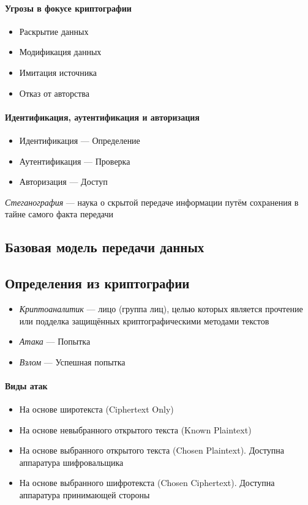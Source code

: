 \documentclass[a4paper, 14pt]{extarticle}
\begin{document}
\paragraph{Угрозы в фокусе криптографии}
\begin{itemize}
    \item Раскрытие данных
    \item Модификация данных
    \item Имитация источника
    \item Отказ от авторства
\end{itemize}

\paragraph{Идентификация, аутентификация и авторизация}
\begin{itemize}
    \item Идентификация --- Определение
    \item Аутентификация --- Проверка
    \item Авторизация --- Доступ
\end{itemize}

\textit{Стеганография} --- наука о скрытой передаче информации путём сохранения в тайне самого факта передачи 

\subsection{Базовая модель передачи данных}

\FloatBarrier{} %
\subsection{Определения из криптографии}

\begin{itemize}
    \item \textit{Криптоаналитик} --- лицо (группа лиц), целью которых является прочтение или подделка защищённых криптографическими методами текстов
    \item \textit{Атака} --- Попытка
    \item \textit{Взлом} --- Успешная попытка
\end{itemize}

\paragraph{Виды атак}
\begin{itemize}
    \item На основе широтекста (Ciphertext Only)
    \item На основе невыбранного открытого текста (Known Plaintext)
    \item На основе выбранного открытого текста (Chosen Plaintext). Доступна аппаратура шифровальщика
    \item На основе выбранного шифротекста (Chosen Ciphertext). Доступна аппаратура принимающей стороны
\end{itemize}
\end{document}
